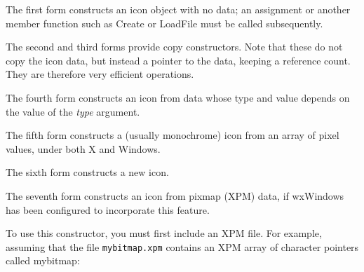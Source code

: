 


The first form constructs an icon object with no data; an assignment or another member function such as Create
or LoadFile must be called subsequently.

The second and third forms provide copy constructors. Note that these do not copy the
icon data, but instead a pointer to the data, keeping a reference count. They are therefore
very efficient operations.

The fourth form constructs an icon from data whose type and value depends on
the value of the {\it type} argument.

The fifth form constructs a (usually monochrome) icon from an array of pixel values, under both
X and Windows.

The sixth form constructs a new icon.

The seventh form constructs an icon from pixmap (XPM) data, if wxWindows has been configured
to incorporate this feature.

To use this constructor, you must first include an XPM file. For
example, assuming that the file {\tt mybitmap.xpm} contains an XPM array
of character pointers called mybitmap:

